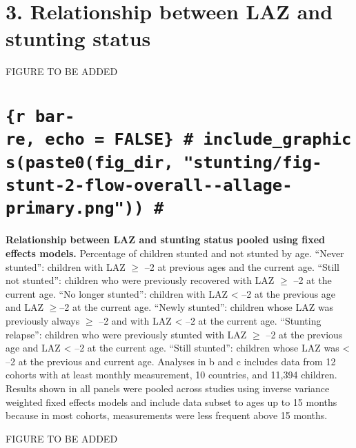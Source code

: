 \documentclass[9pt,]{article}
\begin{document}
\hypertarget{relationship-between-laz-and-stunting-status}{%
\section{3. Relationship between LAZ and stunting
status}\label{relationship-between-laz-and-stunting-status}}

FIGURE TO BE ADDED

\hypertarget{r-bar-re-echo-false-include_graphicspaste0fig_dir-stuntingfig-stunt-2-flow-overall--allage-primary.png}{%
\section{\texorpdfstring{\texttt{\{r\ bar-re,\ echo\ =\ FALSE\}\ \#\ include\_graphics(paste0(fig\_dir,\ "stunting/fig-stunt-2-flow-overall-\/-allage-primary.png"))\ \#}}{\{r bar-re, echo = FALSE\} \# include\_graphics(paste0(fig\_dir, "stunting/fig-stunt-2-flow-overall-\/-allage-primary.png")) \#}}\label{r-bar-re-echo-false-include_graphicspaste0fig_dir-stuntingfig-stunt-2-flow-overall--allage-primary.png}}

\textbf{Relationship between LAZ and stunting status pooled using fixed
effects models.} Percentage of children stunted and not stunted by age.
``Never stunted'': children with LAZ \(\ge\) --2 at previous ages and
the current age. ``Still not stunted'': children who were previously
recovered with LAZ \(\ge\) --2 at the current age. ``No longer
stunted'': children with LAZ \textless{} --2 at the previous age and LAZ
\(\ge\)--2 at the current age. ``Newly stunted'': children whose LAZ was
previously always \(\ge\) --2 and with LAZ \textless{} --2 at the
current age. ``Stunting relapse'': children who were previously stunted
with LAZ \(\ge\) --2 at the previous age and LAZ \textless{} --2 at the
current age. ``Still stunted'': children whose LAZ was \textless{} --2
at the previous and current age. Analyses in b and c includes data from
12 cohorts with at least monthly measurement, 10 countries, and 11,394
children. Results shown in all panels were pooled across studies using
inverse variance weighted fixed effects models and include data subset
to ages up to 15 months because in most cohorts, measurements were less
frequent above 15 months.

FIGURE TO BE ADDED
\end{document}
